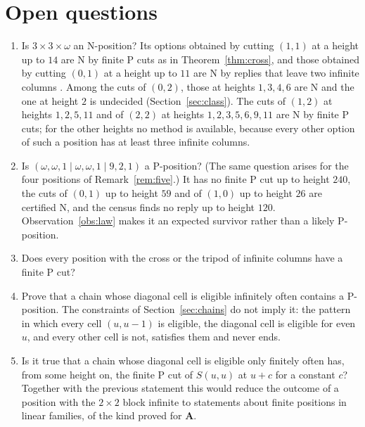 \documentclass[11pt]{amsart}
\theoremstyle{definition}
\theoremstyle{remark}
\newcommand{\w}{\omega}
\newcommand{\PA}{\mathbf{A}}
\begin{document}
\section{Open questions}\label{sec:open}
\begin{enumerate}
\item Is $3\times3\times\omega$ an N-position? Its options obtained by cutting $(1,1)$ at a
height up to $14$ are N by finite P cuts as in Theorem~\ref{thm:cross}, and those obtained by
cutting $(0,1)$ at a height up to $11$ are N by replies that leave two infinite columns
\cite{repo}. Among the cuts of $(0,2)$, those at heights $1,3,4,6$ are N and the one at
height $2$ is undecided (Section~\ref{sec:class}). The cuts of $(1,2)$ at heights $1,2,5,11$
and of $(2,2)$ at heights $1,2,3,5,6,9,11$ are N by finite P cuts; for the other heights no
method is available, because every other option of such a position has at least three
infinite columns.
\item Is $(\w,\w,1\mid\w,\w,1\mid9,2,1)$ a P-position? (The same question arises for the four
positions of Remark~\ref{rem:five}.) It has no finite P cut up to height
$240$, the cuts of $(0,1)$ up to height $59$ and of $(1,0)$ up to height $26$ are certified N,
and the census finds no reply up to height $120$. Observation~\ref{obs:law} makes it an
expected survivor rather than a likely P-position.
\item Does every position with the cross or the tripod of infinite columns have a finite P
cut?
\item Prove that a chain whose diagonal cell is eligible infinitely often contains a
P-position. The constraints of Section~\ref{sec:chains} do not imply it: the pattern in which
every cell $(u,u-1)$ is eligible, the diagonal cell is eligible for even $u$, and every other
cell is not, satisfies them and never ends.
\item Is it true that a chain whose diagonal cell is eligible only finitely often has, from
some height on, the finite P cut of $S(u,u)$ at $u+c$ for a constant $c$? Together with the
previous statement this would reduce the outcome of a position with the $2\times2$ block
infinite to statements about finite positions in linear families, of the kind proved for
$\PA$.
\end{enumerate}

\appendix
\end{document}

